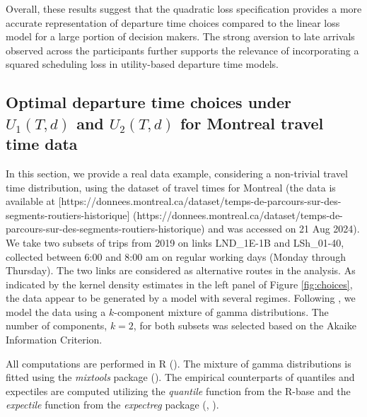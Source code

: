 \documentclass[preprint, 3p, authoryear]{elsarticle} %
\theoremstyle{definition}
\theoremstyle{definition}
\theoremstyle{definition}
\theoremstyle{definition}
\theoremstyle{remark}
\begin{document}
Overall, these results suggest that the quadratic loss specification provides a more accurate representation of departure time choices compared to the linear loss model for a large portion of decision makers. The strong aversion to late arrivals observed across the participants further supports the relevance of incorporating a squared scheduling loss in utility-based departure time models.

\hypertarget{optimal-departure-time-choices-under-u_1td-and-u_2td-for-montreal-travel-time-data}{%
\subsection{\texorpdfstring{Optimal departure time choices under \(U_1(T,d)\) and \(U_2(T,d)\) for Montreal travel time data}{Optimal departure time choices under U\_1(T,d) and U\_2(T,d) for Montreal travel time data}}\label{optimal-departure-time-choices-under-u_1td-and-u_2td-for-montreal-travel-time-data}}

In this section, we provide a real data example, considering a non-trivial travel time distribution, using the dataset of travel times for Montreal (the data is available at
{[}https://donnees.montreal.ca/dataset/temps-de-parcours-sur-des-segments-routiers-historique{]} (https://donnees.montreal.ca/dataset/temps-de-parcours-sur-des-segments-routiers-historique) and was accessed on 21 Aug 2024). We take two subsets of trips from 2019 on links LND\_1E-1B and LSh\_01-40, collected between 6:00 and 8:00 am on regular working days (Monday through Thursday). The two links are considered as alternative routes in the analysis. As indicated by the kernel density estimates in the left panel of Figure \ref{fig:choices}, the data appear to be generated by a model with several regimes. Following \citet{jabari2019}, we model the data using a \(k\)-component mixture of gamma distributions. The number of components, \(k=2\), for both subsets was selected based on the Akaike Information Criterion.

All computations are performed in R (\citet{rr}). The mixture of gamma distributions is fitted using the \emph{mixtools} package (\citet{mixtools}). The empirical counterparts of quantiles and expectiles are computed utilizing the \emph{quantile} function from the R-base and the \emph{expectile} function from the \emph{expectreg} package (\citet{expectregl}, \citet{expectreg}).
\end{document}
